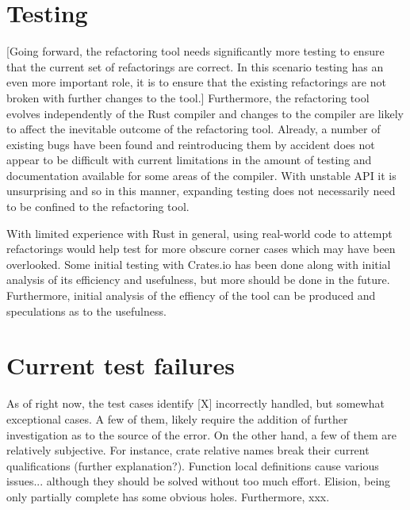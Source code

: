 \section{Testing}
[Going forward, the refactoring tool needs significantly more testing to ensure that the current set of refactorings are correct. In this scenario testing has an even more important role, it is to ensure that the existing refactorings are not broken with further changes to the tool.] Furthermore, the refactoring tool evolves independently of the Rust compiler and changes to the compiler are likely to affect the inevitable outcome of the refactoring tool. Already, a number of existing bugs have been found and reintroducing them by accident does not appear to be difficult with current limitations in the amount of testing and documentation available for some areas of the compiler. With unstable API it is unsurprising and so in this manner, expanding testing does not necessarily need to be confined to the refactoring tool. 


With limited experience with Rust in general, using real-world code to attempt refactorings would help test for more obscure corner cases which may have been overlooked. Some initial testing with Crates.io \cite{cratesio15} has been done along with initial analysis of its efficiency and usefulness, but more should be done in the future. Furthermore, initial analysis of the effiency of the tool can be produced and speculations as to the usefulness. 


\section{Current test failures}
As of right now, the test cases identify [X] incorrectly handled, but somewhat exceptional cases. A few of them, likely require the addition of further investigation as to the source of the error. On the other hand, a few of them are relatively subjective. For instance, crate relative names break their current qualifications (further explanation?). Function local definitions cause various issues... although they should be solved without too much effort. Elision, being only partially complete has some obvious holes. Furthermore, xxx.

